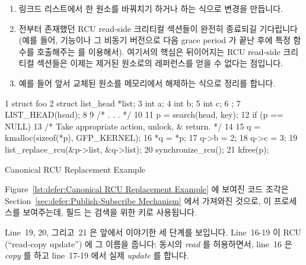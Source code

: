 \begin{enumerate}
\item	링크드 리스트에서 한 원소를 바꿔치기 하거나 하는 식으로 변경을
	만듭니다.
\item	전부터 존재했던 RCU read-side 크리티컬 섹션들이 완전히 종료되길
	기다립니다 (예를 들어,  기능이나 그 비동기
	버전으로 다음 grace period 가 끝난 후에 특정 함수를 호출해주는
	 를 이용해서).
	여기서의 핵심은 뒤이어지는 RCU read-side 크리티컬 섹션들은 이제는
	제거된 원소로의 레퍼런스를 얻을 수 없다는 점입니다.
\item	예를 들어 앞서 교체된 원소를 메모리에서 해제하는 식으로 정리를 합니다.

\end{enumerate}

\begin{listing}[tbp]
{ \scriptsize
\begin{verbbox}
  1 struct foo {
  2   struct list_head *list;
  3   int a;
  4   int b;
  5   int c;
  6 };
  7 LIST_HEAD(head);
  8
  9 /* . . . */
 10
 11 p = search(head, key);
 12 if (p == NULL) {
 13   /* Take appropriate action, unlock, & return. */
 14 }
 15 q = kmalloc(sizeof(*p), GFP_KERNEL);
 16 *q = *p;
 17 q->b = 2;
 18 q->c = 3;
 19 list_replace_rcu(&p->list, &q->list);
 20 synchronize_rcu();
 21 kfree(p);
\end{verbbox}
}
\centering
\theverbbox
\caption{Canonical RCU Replacement Example}
\label{lst:defer:Canonical RCU Replacement Example}
\end{listing}

Figure~\ref{lst:defer:Canonical RCU Replacement Example} 에 보여진 코드 조각은
Section~\ref{sec:defer:Publish-Subscribe Mechanism} 에서 가져와진 것으로, 이
프로세스를 보여주는데, 필드  는 검색을 위한 키로 사용됩니다.

Line~19, 20, 그리고~21 은 앞에서 이야기한 세 단계를 보입니다.
Line~16-19 이 RCU (``read-copy update'') 에 그 이름을 줍니다: 동시의
\emph{read} 를 허용하면서, line~16 은 \emph{copy} 를 하고 line~17-19 에서 실제
\emph{update} 를 합니다.
\iffalse

